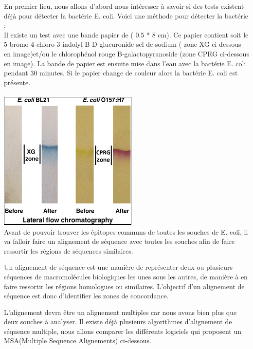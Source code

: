 \documentclass{article}
\begin{document}
En premier lieu, nous allons d'abord nous intéresser à savoir si des tests existent déjà pour détecter la bactérie E. coli. Voici une méthode pour détecter la bactérie :\\
Il existe un test avec une bande papier de ( 0.5 * 8 cm). Ce papier contient soit le 5-bromo-4-chloro-3-indolyl-B-D-glucuronide sel de sodium ( zone XG ci-dessous en image)et/ou le chlorophénol rouge B-galactopyranoside (zone CPRG ci-dessous en image). La bande de papier est ensuite mise dans l'eau avec la bactérie E. coli pendant 30 minutes. Si le papier change de couleur alors la bactérie E. coli est présente.\\\\
  \includegraphics{./img/ecoli.png}\\



Avant de pouvoir trouver les épitopes communs de toutes les souches de E. coli, il va falloir faire un alignement de séquence avec toutes les souches afin de faire ressortir les régions de séquences similaires.

Un alignement de séquence est une manière de représenter deux ou plusieurs séquences de macromolécules biologiques les unes sous les autres, de manière à en faire ressortir les régions homologues ou similaires. L'objectif d'un alignement de séquence est donc d'identifier les zones de concordance.

 L'alignement devra être un alignement multiples car nous avons bien plus que deux souches à analyser. Il existe déjà plusieurs algorithmes d'alignement de séquence multiple, nous allons comparer les différents logiciels qui proposent un MSA(Multiple Sequence Alignements) ci-dessous.
 
\end{document}
